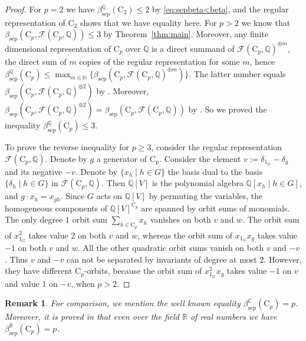 \documentclass[12pt, oneside]{amsart}
\newtheorem{remark}[theorem]{\bf Remark}
\def\NN{\mathbb{N}}
\def\QQ{\mathbb{Q}}
\def\RR{\mathbb{R}}
\def\CC{\mathbb{C}}
\def\sepbeta{\beta_{\mathrm{sep}}}
\begin{document}
\begin{proof} 
For $p=2$ we have  $\sepbeta^\QQ(\mathrm{C}_2)\le 2$ by \eqref{eq:sepbeta<beta}, and  
the regular representation of $\mathrm{C}_2$ shows that we have equality here. 
For $p>2$ we know that $\sepbeta(\mathrm{C}_p,\mathcal{F}(\mathrm{C}_p,\QQ))\le 3$ 
by Theorem~\ref{thm:main}. Moreover, any finite dimensional representation 
of $\mathrm{C}_p$ over $\QQ$ is a direct summand of 
$\mathcal{F}(\mathrm{C}_p,\QQ)^{\oplus m}$, the direct sum of $m$ copies of the 
regular representation for some $m$, hence 
$\sepbeta^\QQ(\mathrm{C}_p)\le 
\max_{m\in \NN}\{\sepbeta(\mathrm{C}_p,\mathcal{F}(\mathrm{C}_p,\QQ)^{\oplus m})\}$. 
The latter number equals $\sepbeta(\mathrm{C}_p,\mathcal{F}(\mathrm{C}_p,\QQ)^{\oplus 2})$ 
by \cite[Proposition 4.3 and 4.4]{domokos:typical}. Moreover, 
$\sepbeta(\mathrm{C}_p,\mathcal{F}(\mathrm{C}_p,\QQ)^{\oplus 2})=\sepbeta(\mathrm{C}_p,\mathcal{F}(\mathrm{C}_p,\QQ))$  by \cite[Theorem 3.4]{draisma-kemper-wehlau}. 
So we proved the inequality $\sepbeta^\QQ(\mathrm{C}_p)\le 3$. 

To prove the reverse inequality for $p\ge 3$, consider the regular representation 
$\mathcal{F}(\mathrm{C}_p,\QQ)$. Denote by $g$ a generator of $\mathrm{C_p}$. 
Consider the element $v:=\delta_{1_G}-\delta_{g}$ and its negative $-v$. 
Denote by $\{x_h\mid h\in G\}$ the basis dual to the basis 
$\{\delta_h\mid h\in G\}$ in $\mathcal{F}(\mathrm{C}_p,\QQ)$. 
Then $\QQ[V]$ is the polynomial algebra $\QQ[x_h\mid h\in G]$, and 
$g\cdot x_h=x_{gh}$. 
Since $G$ acts on $\QQ[V]$ by permuting the variables, 
the homogeneous components of 
$\QQ[V]^{\mathrm{C}_p}$ are spanned by orbit sums of monomials. 
The only degree $1$ orbit sum $\sum_{h\in \mathrm{C}_p}x_h$ 
vanishes on both $v$ and $w$. 
The orbit sum of $x_{1_G}^2$ 
takes value 2 on both $v$ and $w$, whereas the orbit sum of 
$x_{1_G}x_g$ takes value $-1$ on both $v$ and $w$. All the other quadratic orbit sums vanish on both $v$ and $-v$. Thus $v$ and $-v$ can not be separated by invariants of degree at most $2$. However, they have different $\mathrm{C}_p$-orbits, 
because the orbit sum of $x_{1_G}^2x_g$ takes value $-1$ on $v$ and value $1$ on $-v$, 
when $p>2$. 
\end{proof} 

\begin{remark}
For comparison, we mention the well known  equality $\sepbeta^\CC(\mathrm{C}_p)=p$. 
Moreover, it is proved in \cite[Proposition 3.13]{blumsmith-garcia-hidalgo-rodriguez} that 
even over the field $\RR$ of real numbers we have 
$\sepbeta^\RR(\mathrm{C}_p)=p$. 
 \end{remark} 
 
\end{document}
